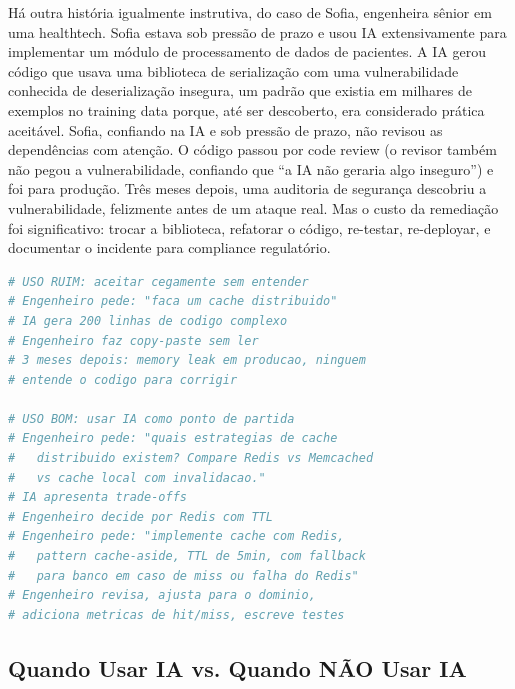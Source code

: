 Há outra história igualmente instrutiva, do caso de Sofia, engenheira sênior em uma
healthtech. Sofia estava sob pressão de prazo e usou IA extensivamente para implementar
um módulo de processamento de dados de pacientes. A IA gerou código que usava uma
biblioteca de serialização com uma vulnerabilidade conhecida de deserialização
insegura, um padrão que existia em milhares de exemplos no training data porque,
até ser descoberto, era considerado prática aceitável. Sofia, confiando na IA e sob
pressão de prazo, não revisou as dependências com atenção. O código passou por code
review (o revisor também não pegou a vulnerabilidade, confiando que ``a IA não geraria
algo inseguro'') e foi para produção. Três meses depois, uma auditoria de segurança
descobriu a vulnerabilidade, felizmente antes de um ataque real. Mas o custo da
remediação foi significativo: trocar a biblioteca, refatorar o código, re-testar,
re-deployar, e documentar o incidente para compliance regulatório.

\begin{lstlisting}[language=Python, caption={Exemplo: uso ruim vs. uso bom de IA}]
# USO RUIM: aceitar cegamente sem entender
# Engenheiro pede: "faca um cache distribuido"
# IA gera 200 linhas de codigo complexo
# Engenheiro faz copy-paste sem ler
# 3 meses depois: memory leak em producao, ninguem
# entende o codigo para corrigir

# USO BOM: usar IA como ponto de partida
# Engenheiro pede: "quais estrategias de cache
#   distribuido existem? Compare Redis vs Memcached
#   vs cache local com invalidacao."
# IA apresenta trade-offs
# Engenheiro decide por Redis com TTL
# Engenheiro pede: "implemente cache com Redis,
#   pattern cache-aside, TTL de 5min, com fallback
#   para banco em caso de miss ou falha do Redis"
# Engenheiro revisa, ajusta para o dominio,
# adiciona metricas de hit/miss, escreve testes
\end{lstlisting}

\subsection{Quando Usar IA vs. Quando NÃO Usar IA}

